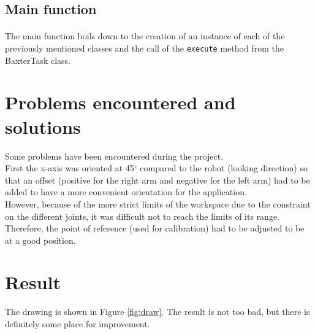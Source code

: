 \subsection{Main function}
\paragraph{}The main function boils down to the creation of an instance of each of the previously mentioned classes and the call of the \lstinline[language=Python, style=pythonColor]{execute} method from the BaxterTask class.

\vspace{2.5cm}

\section{Problems encountered and solutions}
Some problems have been encountered during the project.\\
First the x-axis was oriented at 45$^\circ$ compared to the robot (looking direction) so that an offset (positive for the right arm and negative for the left arm) had to be added to have a more convenient orientation for the application. \\ However, because of the more strict limits of the workspace due to the constraint on the different joints, it was difficult not to reach the limits of its range. Therefore, the point of reference (used for calibration) had to be adjusted to be at a good position.

\newpage

\section{Result}
The drawing is shown in Figure \ref{fig:draw}. The result is not too bad, but there is definitely some place for improvement. 

